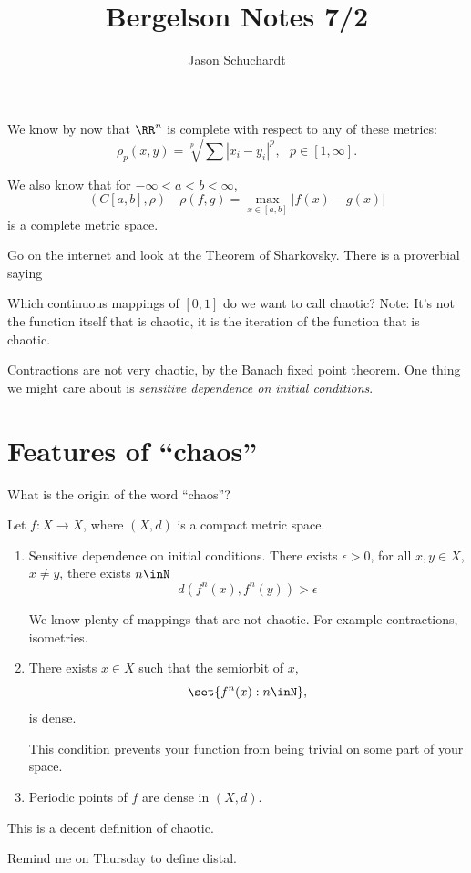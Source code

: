 \documentclass{article}
\title{Bergelson Notes 7/2}
\author{Jason Schuchardt}
\theoremstyle{remark}
\begin{document}
\maketitle

We know by now that $\RR^n$ is complete with respect
to any of these metrics:
\[\rho_p(x,y) = \sqrt[p]{\sum |x_i-y_i|^p}, \text{ $p\in [1,\infty]$.} \]

We also know that for $-\infty < a < b < \infty$,
\[ (C[a,b],\rho)\quad \rho(f,g) =\max_{x\in[a,b]} |f(x)-g(x)| \]
is a complete metric space.

Go on the internet and look at the Theorem of Sharkovsky.
There is a proverbial saying 

Which continuous mappings of $[0,1]$ do we want to call chaotic?
Note: It's not the function itself that is chaotic, it is 
the iteration of the function that is chaotic.

Contractions are not very chaotic, by the Banach fixed point 
theorem. One thing we might care about is 
\emph{sensitive dependence on initial conditions}.

\section{Features of ``chaos''}

What is the origin of the word ``chaos''?

Let $f:X\to X$, where $(X,d)$ is a compact metric space.
\begin{enumerate}
    \item Sensitive dependence on initial conditions.
        There exists $\epsilon > 0$, for all 
        $x,y\in X$, $x\ne y$, there exists $n\inN$
        \[
        d(f^n(x),f^n(y)) > \epsilon
        \]

        We know plenty of mappings that are not chaotic.
        For example contractions, isometries. 
    \item There exists $x\in X$ such that
        the semiorbit of $x$,
        \[ \set{f^n(x) : n\inN}, \]
        is dense.

        This condition prevents your function from being trivial
        on some part of your space.

    \item Periodic points of $f$ are dense in $(X,d)$.
\end{enumerate}

This is a decent definition of chaotic.

Remind me on Thursday to define distal.
\end{document}
